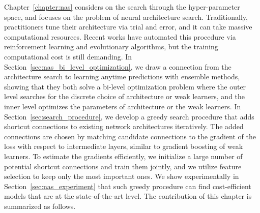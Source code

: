 Chapter~\ref{chapter:nas} considers on the search through the hyper-parameter space, and focuses on the problem of neural architecture search. 
Traditionally, practitioners tune their architecture via trial and error, and it can take massive computational resources. 
Recent works have automated this procedure via reinforcement learning and evolutionary algorithms, but the training computational cost
is still demanding. In Section~\ref{sec:nas_bi_level_optimization}, we draw a connection from the architecture search to learning anytime predictions with ensemble methods, showing that they both solve a bi-level optimization problem where the outer level searches for the discrete choice of architecture or weak learners, and the inner level optimizes the parameters of architecture or the weak learners. In Section~\ref{sec:search_procedure}, we develop a greedy search procedure that adds shortcut connections to existing network architectures iteratively. The added connections are chosen by matching candidate connections to the gradient of the loss with respect to intermediate layers, similar to gradient boosting of weak learners. To estimate the gradients efficiently, we initialize a large number of potential shortcut connections and train them jointly, and we utilize feature selection to keep only the most important ones. We show experimentally in Section~\ref{sec:nas_experiment} that such greedy procedure can find cost-efficient models that are at the state-of-the-art level. 
The contribution of this chapter is summarized as follows.


